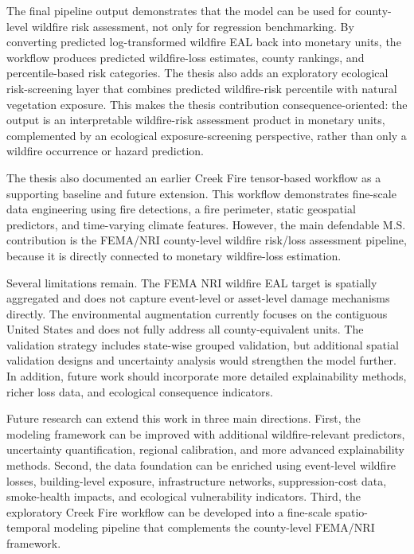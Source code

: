 The final pipeline output demonstrates that the model can be used for county-level wildfire risk assessment, not only for regression benchmarking. By converting predicted log-transformed wildfire EAL back into monetary units, the workflow produces predicted wildfire-loss estimates, county rankings, and percentile-based risk categories. The thesis also adds an exploratory ecological risk-screening layer that combines predicted wildfire-risk percentile with natural vegetation exposure. This makes the thesis contribution consequence-oriented: the output is an interpretable wildfire-risk assessment product in monetary units, complemented by an ecological exposure-screening perspective, rather than only a wildfire occurrence or hazard prediction.

The thesis also documented an earlier Creek Fire tensor-based workflow as a supporting baseline and future extension. This workflow demonstrates fine-scale data engineering using fire detections, a fire perimeter, static geospatial predictors, and time-varying climate features. However, the main defendable M.S. contribution is the FEMA/NRI county-level wildfire risk/loss assessment pipeline, because it is directly connected to monetary wildfire-loss estimation.

Several limitations remain. The FEMA NRI wildfire EAL target is spatially aggregated and does not capture event-level or asset-level damage mechanisms directly. The environmental augmentation currently focuses on the contiguous United States and does not fully address all county-equivalent units. The validation strategy includes state-wise grouped validation, but additional spatial validation designs and uncertainty analysis would strengthen the model further. In addition, future work should incorporate more detailed explainability methods, richer loss data, and ecological consequence indicators.

Future research can extend this work in three main directions. First, the modeling framework can be improved with additional wildfire-relevant predictors, uncertainty quantification, regional calibration, and more advanced explainability methods. Second, the data foundation can be enriched using event-level wildfire losses, building-level exposure, infrastructure networks, suppression-cost data, smoke-health impacts, and ecological vulnerability indicators. Third, the exploratory Creek Fire workflow can be developed into a fine-scale spatio-temporal modeling pipeline that complements the county-level FEMA/NRI framework.

